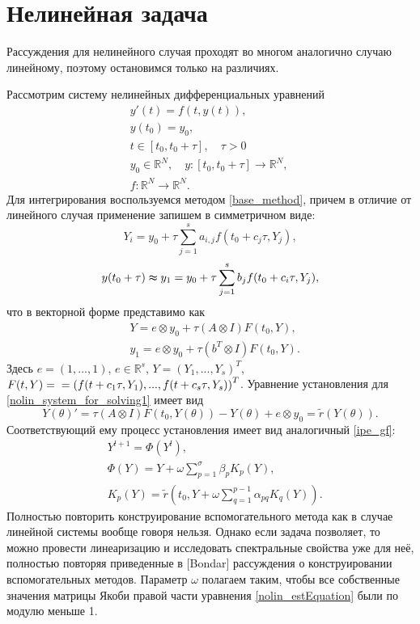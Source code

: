 \documentclass[a4paper,12pt]{report}
\begin{document}
  \section{Нелинейная задача}
  \label{s:non_linear_problem} 
  
Рассуждения для нелинейного случая проходят во многом аналогично случаю линейному, поэтому остановимся только на различиях.

Рассмотрим систему нелинейных дифференциальных уравнений
	\begin{equation}
	\begin{aligned}
	\label{nolin_main_problem}
	&y'(t)=f(t, y(t)),\\
	&y(t_0)=y_0,\\
	&t \in [t_0, t_0+\tau],\quad \tau>0 \\
	&y_0\in \mathbb{R}^N,\quad
	y:[t_0,t_0+\tau] \to \mathbb{R}^N,\quad\\
	&f:  \mathbb{R}^N \to \mathbb{R}^N.
	\end{aligned}
	\end{equation}
Для интегрирования воспользуемся методом \eqref{base_method}, причем в отличие от линейного случая применение запишем в симметричном виде:
	$$Y_i = y_0+\tau \sum_{j = 1}^s a_{i,j}f(t_0+c_j \tau,Y_j), $$
	$$y(t_0+\tau)\thickapprox y_1 = y_0 + \tau \sum_{j = 1}^s b_{j}f(t_0+c_i \tau,Y_j),$$
что в векторной форме представимо как
	\begin{equation}
	\begin{aligned}
	\label{nolin_system_for_solving1}
	&Y = e\otimes y_0 +\tau (A\otimes I)F(t_0,Y),\\
	&y_1 = e\otimes y_0 +\tau(b^T\otimes I)F(t_0,Y).
	\end{aligned}
	\end{equation}
Здесь $e = (1,..., 1)$, $e \in \mathbb R^s$,  $Y = (Y_1, ...,Y_s)^T$, $F(t, Y) =\\= \left(f(t+c_1 \tau,Y_1),..., f(t+c_s \tau,Y_s) \right)^T$.
Уравнение установления для \eqref{nolin_system_for_solving1} имеет вид
	\begin{equation}
	\label{nolin_estEquation} Y(\theta)'=\tau (A\otimes I)F(t_0,Y(\theta)) -Y(\theta)+ e\otimes y_0 = \tilde r(Y(\theta)).
	\end{equation}
Соответствующий ему процесс установления имеет вид аналогичный \eqref{ipe_gf}:
	\begin{equation}
	\label{nolin_ipe_gf}
	\begin{aligned}
	&Y^{l+1}=\Phi(Y^{l}),\\
	&\Phi(Y)=Y+\omega \sum_{p=1}^{\sigma}\beta_{p}K_p(Y),\\
	&K_p(Y)=\tilde r(t_0,Y+\omega \sum_{q=1}^{p-1}\alpha_{pq}K_q(Y)).
	\end{aligned}
	\end{equation}
Полностью повторить конструирование вспомогательного метода как в случае
линейной системы вообще говоря нельзя. Однако если задача позволяет, то можно
провести линеаризацию и исследовать спектральные свойства уже для неё, полностью
повторяя приведенные в [Bondar] рассуждения о конструировании вспомогательных методов.
Параметр $\omega$ полагаем таким, чтобы все собственные значения матрицы Якоби
правой части уравнения \eqref{nolin_estEquation} были по модулю меньше 1.
  
\end{document}
